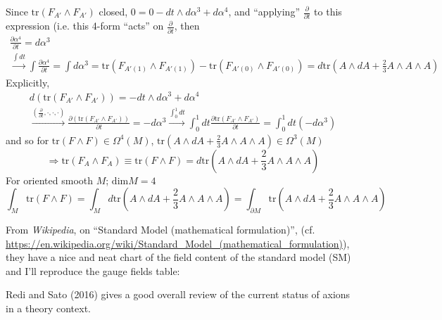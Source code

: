 \documentclass[10pt]{amsart}
\begin{document}
Since $\text{tr}(F_{A'} \wedge F_{A'})$ closed, $0 = 0 - dt \wedge d\alpha^3 + d\alpha^4$, and ``applying'' $\frac{ \partial }{ \partial t}$ to this expression (i.e. this 4-form ``acts'' on $\frac{ \partial }{ \partial t}$, then 
\[
\begin{gathered}
  \frac{ \partial \alpha^4}{ \partial t} = d\alpha^3 \\ 
\xrightarrow{ \int dt } \int \frac{ \partial \alpha^4}{ \partial t} = \int d\alpha^3 = \text{tr}(F_{A'(1)} \wedge F_{A'(1)} ) - \text{tr}(F_{A'(0)} \wedge F_{A'(0) } ) = d\text{tr}(A\wedge dA + \frac{2}{3} A \wedge A \wedge A)
\end{gathered}
\]
Explicitly,
\[
\begin{gathered}
  d(\text{tr}(F_{A'} \wedge F_{A'}) ) = -dt \wedge d\alpha^3 + d\alpha^4 \\ 
  \xrightarrow{ \left( \frac{ \partial }{ \partial t} , \cdot, \cdot, \cdot \right) } \frac{ \partial ( \text{tr}(F_{A'} \wedge F_{A'} ) ) }{ \partial t} = - d\alpha^3 \xrightarrow{ \int_0^1 dt } \int_0^1 dt \frac{ \partial \text{tr}( F_{A'} \wedge F_{A'})}{ \partial t} = \int_0^1 dt ( -d\alpha^3)
\end{gathered}
\]
and so for $\text{tr}(F\wedge F) \in \Omega^4(M)$, $\text{tr}(A \wedge dA + \frac{2}{3} A \wedge A \wedge A) \in \Omega^3(M)$
\[
\Longrightarrow \text{tr}(F_A \wedge F_A) \equiv \text{tr}(F\wedge F) = d\text{tr}(A \wedge dA + \frac{2}{3} A \wedge A \wedge A )
\]
For oriented smooth $M$; $\text{dim}M=4$
\[
\int_M \text{tr}(F\wedge F)= \int_M d\text{tr}(A \wedge dA + \frac{2}{3} A \wedge A \wedge A ) = \int_{\partial M} \text{tr}(A \wedge dA + \frac{2}{3} A \wedge A \wedge A)
\]


From \emph{Wikipedia}, on ``Standard Model (mathematical formulation)'', (cf. \url{https://en.wikipedia.org/wiki/Standard_Model_(mathematical_formulation)}), they have a nice and neat chart of the field content of the standard model (SM) and I'll reproduce the gauge fields table:



Redi and Sato (2016) \cite{RS1602} gives a good overall review of the current status of axions in a theory context.
\end{document}
